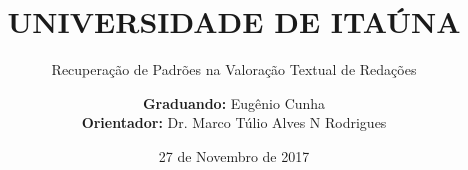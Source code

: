 \title{UNIVERSIDADE DE ITAÚNA}
\subtitle{Recuperação de Padrões na Valoração Textual de Redações}
\date{27 de Novembro de 2017}
\author{\textbf{Graduando:} Eugênio Cunha \\ \textbf{Orientador:} Dr. Marco Túlio Alves N Rodrigues}
